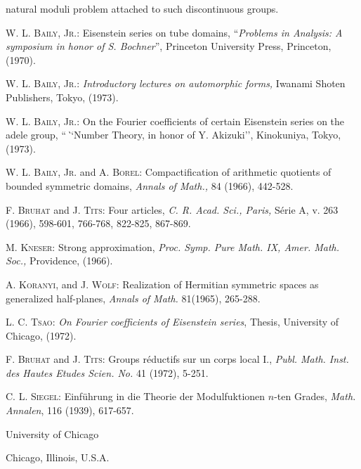 natural moduli problem attached to such discontinuous groups.


\begin{thebibliography}{99}
 \textsc{W. L. Baily, Jr.}: Eisenstein series on tube domains, ``\textit{Problems in Analysis: A symposium in honor of S. Bochner}'', Princeton University Press, Princeton, (1970).

 \textsc{W. L. Baily, Jr.}: \textit{Introductory lectures on automorphic forms,} Iwanami Shoten Publishers, Tokyo, (1973).

 \textsc{W. L. Baily, Jr.}: On the Fourier coefficients of certain Eisenstein series on the adele group, ``\textit``{Number Theory, in honor of Y. Akizuki}'', Kinokuniya, Tokyo, (1973).

 \textsc{W. L. Baily, Jr.} and \textsc{A. Borel}: Compactification of arithmetic quotients of bounded symmetric domains, \textit{Annals of Math.,} 84 (1966), 442-528.

 \textsc{F. Bruhat} and \textsc{J. Tits:} Four articles, \textit{C. R. Acad. Sci., Paris,} S\'erie A, v. 263 (1966), 598-601, 766-768, 822-825, 867-869. 

 \textsc{M. Kneser}: Strong approximation, \textit{Proc. Symp. Pure Math. IX, Amer. Math. Soc.,} Providence, (1966).

 \textsc{A. Koranyi}, and \textsc{J. Wolf}: Realization of Hermitian symmetric spaces as generalized half-planes, \textit{Annals of Math.} 81(1965), 265-288.

 \textsc{L. C. Tsao}: \textit{On Fourier coefficients of Eisenstein series}, Thesis, University of Chicago, (1972).

 \textsc{F. Bruhat} and \textsc{J. Tits}: Groups r\'eductifs sur un corps local I., \textit{Publ. Math. Inst. des Hautes Etudes Scien. No.} 41 (1972), 5-251.

  \textsc{C. L. Siegel}: Einf\"uhrung in die Theorie der Modulfuktionen $n$-ten Grades, \textit{Math. Annalen}, 116 (1939), 617-657.
\end{thebibliography}


\bigskip
\noindent
{\small University of Chicago}

\noindent
{\small Chicago, Illinois, U.S.A.}
